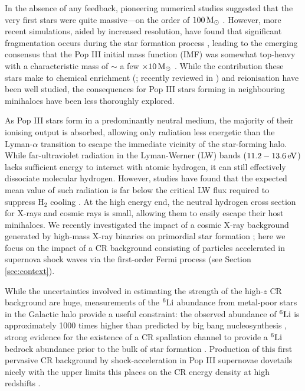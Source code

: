 \documentclass[usenatbib]{mn2e}
\newcommand{\msun}{\,{\rm M}_{\odot}}
\newcommand{\ev}{\,{\rm eV}}
\newcommand{\htwo}{\mathrm{H}_2}
\begin{document}
In the absence of any feedback, pioneering numerical studies suggested that the very first stars were quite massive---on the order of $100\msun$ \citep[e.g.,][]{BrommCoppiLarson1999,BrommCoppiLarson2002,AbelBryanNorman2002,Yoshidaetal2003,BrommLarson2004,Yoshidaetal2006,OSheaNorman2007}. 
However, more recent simulations, aided by increased resolution, have found that significant fragmentation occurs during the star formation process \citep{StacyGreifBromm2010,Clarketal2011a,Clarketal2011b,Greifetal2011,Greifetal2012,StacyBromm2013,Hiranoetal2014,Hosokawaetal2015}, leading to the emerging consensus that the Pop III initial mass function (IMF) was somewhat top-heavy with a characteristic mass of $\sim$ a few $\times 10\msun$ \citep{Bromm2013}. 
While the contribution these stars make to chemical enrichment (\citealt{MadauFerraraRees2001,MoriFerraraMadau2002,BrommYoshidaHernquist2003,Hegeretal2003,UmedaNomoto2003,TornatoreFerraraSchneider2007,Greifetal2007,Greifetal2010,WiseAbel2008,Maioetal2011}; recently reviewed in \citealt{KarlssonBrommHawthorn2013}) and  reionisation \citep{Kitayamaetal2004,Sokasianetal2004,WhalenAbelNorman2004,AlvarezBrommShapiro2006,JohnsonGreifBromm2007,Robertsonetal2010} have been well studied, the consequences for Pop III stars forming in neighbouring minihaloes have been less thoroughly explored.  

As Pop III stars form in a predominantly neutral medium, the majority of their ionising output is absorbed, allowing only radiation less energetic than the Lyman-$\alpha$ transition to escape the immediate vicinity of the star-forming halo.  
While far-ultraviolet radiation in the Lyman-Werner (LW) bands ($11.2 - 13.6\ev$) lacks sufficient energy to interact with atomic hydrogen, it can still effectively dissociate molecular hydrogen.  
However, studies have found that the expected mean value of such radiation is far below the critical LW flux required to suppress $\htwo$ cooling \mbox{\citep{Dijkstraetal2008}}. 
At the high energy end, the neutral hydrogen cross section for X-rays and cosmic rays is small, allowing them to easily escape their host minihaloes. 
We recently investigated the impact of a cosmic X-ray background generated by high-mass X-ray binaries on primordial star formation \citep{Hummeletal2015}; here we focus on the impact of a CR background consisting of particles accelerated in supernova shock waves via the first-order Fermi process (see Section \ref{sec:context}).  

While the uncertainties involved in estimating the strength of the high-$z$  CR background are huge,  measurements of the $^6{\rm Li}$ abundance from metal-poor stars in the Galactic halo provide a useful constraint: the observed abundance of  $^6{\rm Li}$ is approximately 1000 times higher than predicted by big bang nucleosynthesis \citep{Asplundetal2006}, strong evidence for the existence of a CR spallation channel to provide a $^6{\rm Li}$ bedrock abundance prior to the bulk of star formation \citep{RollindeVangioniOlive2005,RollindeVangioniOlive2006}. 
Production of this first pervasive CR background by shock-acceleration in Pop III supernovae dovetails nicely with the upper limits this places on the CR energy density at high redshifts \citep{RollindeVangioniOlive2006}.
\end{document}
